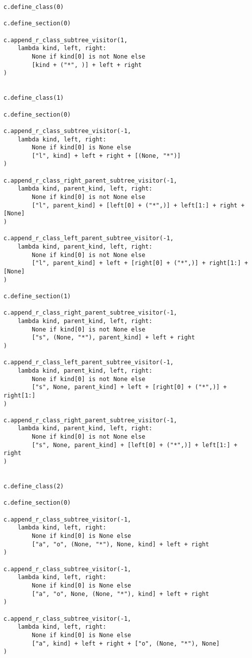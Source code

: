\documentclass[final]{article}
\theoremstyle{definition}
\theoremstyle{remark}
\begin{document}
\begin{lstlisting}
c.define_class(0)

c.define_section(0)

c.append_r_class_subtree_visitor(1,
    lambda kind, left, right:
        None if kind[0] is not None else
        [kind + ("*", )] + left + right
)


c.define_class(1)

c.define_section(0)

c.append_r_class_subtree_visitor(-1,
    lambda kind, left, right:
        None if kind[0] is None else
        ["l", kind] + left + right + [(None, "*")]
)

c.append_r_class_right_parent_subtree_visitor(-1,
    lambda kind, parent_kind, left, right:
        None if kind[0] is not None else
        ["l", parent_kind] + [left[0] + ("*",)] + left[1:] + right + [None]
)

c.append_r_class_left_parent_subtree_visitor(-1,
    lambda kind, parent_kind, left, right:
        None if kind[0] is not None else
        ["l", parent_kind] + left + [right[0] + ("*",)] + right[1:] + [None]
)

c.define_section(1)

c.append_r_class_right_parent_subtree_visitor(-1,
    lambda kind, parent_kind, left, right:
        None if kind[0] is not None else
        ["s", (None, "*"), parent_kind] + left + right
)

c.append_r_class_left_parent_subtree_visitor(-1,
    lambda kind, parent_kind, left, right:
        None if kind[0] is not None else
        ["s", None, parent_kind] + left + [right[0] + ("*",)] + right[1:]
)

c.append_r_class_right_parent_subtree_visitor(-1,
    lambda kind, parent_kind, left, right:
        None if kind[0] is not None else
        ["s", None, parent_kind] + [left[0] + ("*",)] + left[1:] + right
)


c.define_class(2)

c.define_section(0)

c.append_r_class_subtree_visitor(-1,
    lambda kind, left, right:
        None if kind[0] is None else
        ["a", "o", (None, "*"), None, kind] + left + right
)

c.append_r_class_subtree_visitor(-1,
    lambda kind, left, right:
        None if kind[0] is None else
        ["a", "o", None, (None, "*"), kind] + left + right
)

c.append_r_class_subtree_visitor(-1,
    lambda kind, left, right:
        None if kind[0] is None else
        ["a", kind] + left + right + ["o", (None, "*"), None]
)


\end{lstlisting}
\end{document}
